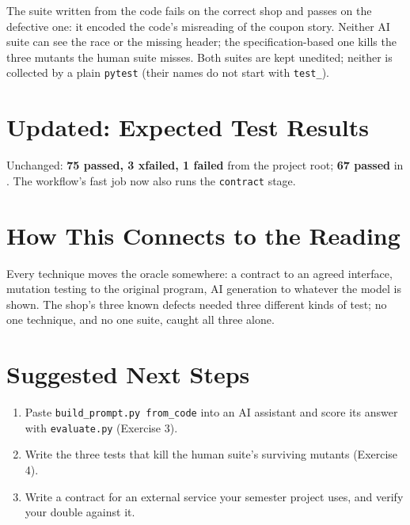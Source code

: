 \documentclass[11pt]{article}
\begin{document}
The suite written from the code fails on the correct shop and passes on
the defective one: it encoded the code's misreading of the coupon
story. Neither AI suite can see the race or the missing header; the
specification-based one kills the three mutants the human suite misses.
Both suites are kept unedited; neither is collected by a plain
\texttt{pytest} (their names do not start with \texttt{test\_}).

\section{Updated: Expected Test Results}
Unchanged: \textbf{75 passed, 3 xfailed, 1 failed} from the project
root; \textbf{67 passed} in .
The workflow's fast job now also runs the \texttt{contract} stage.

\section{How This Connects to the Reading}
\begin{keyidea}
Every technique moves the oracle somewhere: a contract to an agreed
interface, mutation testing to the original program, AI generation to
whatever the model is shown. The shop's three known defects needed three
different kinds of test; no one technique, and no one suite, caught all
three alone.
\end{keyidea}

\section{Suggested Next Steps}
\begin{enumerate}
\item Paste \texttt{build\_prompt.py from\_code} into an AI assistant and
score its answer with \texttt{evaluate.py} (Exercise 3).
\item Write the three tests that kill the human suite's surviving
mutants (Exercise 4).
\item Write a contract for an external service your semester project
uses, and verify your double against it.
\end{enumerate}
\end{document}
